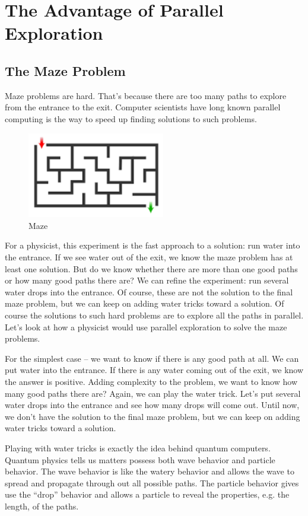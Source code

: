 \documentclass{book}
\begin{document}
\section{The Advantage of Parallel Exploration}
\subsection{The Maze Problem}
Maze problems are hard. That's because there are too many paths to explore from the entrance to the exit. Computer scientists have long known parallel computing is the way to speed up finding solutions to such problems.

\begin{figure}[ht]
\includegraphics[width=6cm]{maze.png}
\caption{Maze}
\label{Maze}
\end{figure}

For a physicist, this experiment is the fast approach to a solution: run water into the entrance. If we see water out of the exit, we know the maze problem has at least one solution. But do we know whether there are more than one good paths or how many good paths there are? We can refine the experiment: run several water drops into the entrance. Of course, these are not the solution to the final maze problem, but we can keep on adding water tricks toward a solution.
Of course the solutions to such hard problems are to explore all the paths in parallel. Let’s look at how a physicist would use parallel exploration to solve the maze problems.

For the simplest case – we want to know if there is any good path at all. We can put water into the entrance. If there is any water coming out of the exit, we know the answer is positive. Adding complexity to the problem, we want to know how many good paths there are? Again, we can play the water trick. Let’s put several water drops into the entrance and see how many drops will come out. Until now, we don't have the solution to the final maze problem, but we can keep on adding water tricks toward a solution.

Playing with water tricks is exactly the idea behind quantum computers. Quantum physics tells us matters possess both wave behavior and particle behavior. The wave behavior is like the watery behavior and allows the wave to spread and propagate through out all possible paths. The particle behavior gives use the “drop” behavior and allows a particle to reveal the properties, e.g. the length, of the paths.
\end{document}
